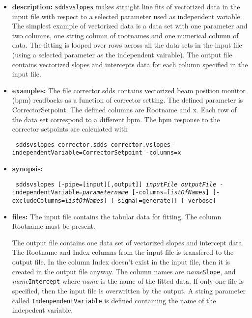 \begin{itemize}
\item {\bf description:}
%
%
\verb|sddsvslopes| makes straight line fits of vectorized data
in the input file with respect to a selected parameter used as independent variable.
The simplest example of vectorized data is a data set with one parameter and two columns,
one string column of rootnames and one numerical column of data.
The fitting is looped over rows across all the 
data sets in the input file (using a selected parameter as the
independent vairable). The output file contains
vectorized slopes and intercepts data for each column specified in the input file.

\item {\bf examples:} 
%
% 
%
The file corrector.sdds contains vectorized  beam position monitor (bpm)
readbacks as a function of corrector setting. The defined parameter is CorrectorSetpoint.
The defined columns are Rootname and x. Each row of the data set correspond to a different
bpm.
The bpm response to the corrector setpoints are calculated with
\begin{flushleft}{\tt
sddsvslopes corrector.sdds corrector.vslopes -independentVariable=CorrectorSetpoint 
  -columns=x
}\end{flushleft}
\item {\bf synopsis:} 
%
%
\begin{flushleft}{\tt
sddsvslopes [-pipe=[input][,output]] {\em inputFile} {\em outputFile} 
        -independentVariable={\em parametername}
        [-columns={\em listOfNames}] [-excludeColumns={\em listOfNames}] 
        [-sigma[=generate]] [-verbose]
}\end{flushleft}
\item {\bf files:}
The input file contains the tabular data for fitting. The column Rootname must be present.

The output file contains one data set of vectorized slopes and intercept data.
The Rootname and Index columns from the input file is transfered to the output file.
In the column Index doesn't exist in the input file, then it is created in the output
file anyway.
The column names are {\em name}\verb|Slope|, and {\em name}\verb|Intercept| 
where {\em name} is the name of the fitted data.
If only one file is specified, then the input file is overwritten by the output.
A string parameter called \verb|IndenpendentVariable| is defined containing the name of the indepedent variable.


\end{itemize}
